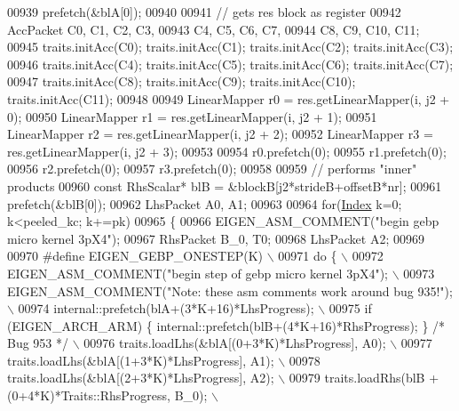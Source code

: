 \begin{DoxyCode}
00939           prefetch(&blA[0]);
00940 
00941           \textcolor{comment}{// gets res block as register}
00942           AccPacket C0, C1, C2,  C3,
00943                     C4, C5, C6,  C7,
00944                     C8, C9, C10, C11;
00945           traits.initAcc(C0);  traits.initAcc(C1);  traits.initAcc(C2);  traits.initAcc(C3);
00946           traits.initAcc(C4);  traits.initAcc(C5);  traits.initAcc(C6);  traits.initAcc(C7);
00947           traits.initAcc(C8);  traits.initAcc(C9);  traits.initAcc(C10); traits.initAcc(C11);
00948 
00949           LinearMapper r0 = res.getLinearMapper(i, j2 + 0);
00950           LinearMapper r1 = res.getLinearMapper(i, j2 + 1);
00951           LinearMapper r2 = res.getLinearMapper(i, j2 + 2);
00952           LinearMapper r3 = res.getLinearMapper(i, j2 + 3);
00953 
00954           r0.prefetch(0);
00955           r1.prefetch(0);
00956           r2.prefetch(0);
00957           r3.prefetch(0);
00958 
00959           \textcolor{comment}{// performs "inner" products}
00960           \textcolor{keyword}{const} RhsScalar* blB = &blockB[j2*strideB+offsetB*nr];
00961           prefetch(&blB[0]);
00962           LhsPacket A0, A1;
00963 
00964           \textcolor{keywordflow}{for}(\hyperlink{namespace_eigen_a62e77e0933482dafde8fe197d9a2cfde}{Index} k=0; k<peeled\_kc; k+=pk)
00965           \{
00966             EIGEN\_ASM\_COMMENT(\textcolor{stringliteral}{"begin gebp micro kernel 3pX4"});
00967             RhsPacket B\_0, T0;
00968             LhsPacket A2;
00969 
00970 \textcolor{preprocessor}{#define EIGEN\_GEBP\_ONESTEP(K) \(\backslash\)}
00971 \textcolor{preprocessor}{            do \{ \(\backslash\)}
00972 \textcolor{preprocessor}{              EIGEN\_ASM\_COMMENT("begin step of gebp micro kernel 3pX4"); \(\backslash\)}
00973 \textcolor{preprocessor}{              EIGEN\_ASM\_COMMENT("Note: these asm comments work around bug 935!"); \(\backslash\)}
00974 \textcolor{preprocessor}{              internal::prefetch(blA+(3*K+16)*LhsProgress); \(\backslash\)}
00975 \textcolor{preprocessor}{              if (EIGEN\_ARCH\_ARM) \{ internal::prefetch(blB+(4*K+16)*RhsProgress); \} }\textcolor{comment}{/* Bug 953 */}\textcolor{preprocessor}{ \(\backslash\)}
00976 \textcolor{preprocessor}{              traits.loadLhs(&blA[(0+3*K)*LhsProgress], A0);  \(\backslash\)}
00977 \textcolor{preprocessor}{              traits.loadLhs(&blA[(1+3*K)*LhsProgress], A1);  \(\backslash\)}
00978 \textcolor{preprocessor}{              traits.loadLhs(&blA[(2+3*K)*LhsProgress], A2);  \(\backslash\)}
00979 \textcolor{preprocessor}{              traits.loadRhs(blB + (0+4*K)*Traits::RhsProgress, B\_0); \(\backslash\)}

\end{DoxyCode}
